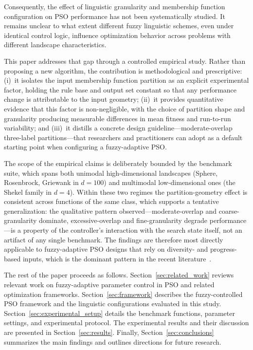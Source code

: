 \documentclass[conference]{IEEEtran}
\newcommand{\new}[1]{{\color{red}#1}}
\begin{document}
Consequently, the effect of linguistic granularity and membership function configuration on PSO performance has not been systematically studied. It remains unclear to what extent different fuzzy linguistic schemes, even under identical control logic, influence optimization behavior across problems with different landscape characteristics.

\new{This paper addresses that gap through a controlled empirical study. Rather than proposing a new algorithm, the contribution is methodological and prescriptive: (i)~it isolates the input membership function partition as an explicit experimental factor, holding the rule base and output set constant so that any performance change is attributable to the input geometry; (ii)~it provides quantitative evidence that this factor is non-negligible, with the choice of partition shape and granularity producing measurable differences in mean fitness and run-to-run variability; and (iii)~it distills a concrete design guideline---moderate-overlap three-label partitions---that researchers and practitioners can adopt as a default starting point when configuring a fuzzy-adaptive PSO.}

\new{The scope of the empirical claims is deliberately bounded by the benchmark suite, which spans both unimodal high-dimensional landscapes (Sphere, Rosenbrock, Griewank in $d{=}100$) and multimodal low-dimensional ones (the Shekel family in $d{=}4$). Within these two regimes the partition-geometry effect is consistent across functions of the same class, which supports a tentative generalization: the qualitative pattern observed---moderate-overlap and coarse-granularity dominate, excessive-overlap and fine-granularity degrade performance---is a property of the controller's interaction with the search state itself, not an artifact of any single benchmark. The findings are therefore most directly applicable to fuzzy-adaptive PSO designs that rely on diversity- and progress-based inputs, which is the dominant pattern in the recent literature~\cite{nobile2018fuzzy, xia2022particle, roy2024hyperparameter, wang2023hierarchical, morales2023stagnation}.}

The rest of the paper proceeds as follows. Section~\ref{sec:related_work} reviews relevant work on fuzzy-adaptive parameter control in PSO and related optimization frameworks. Section~\ref{sec:framework} describes the fuzzy-controlled PSO framework and the linguistic configurations evaluated in this study. Section~\ref{sec:experimental_setup} details the benchmark functions, parameter settings, and experimental protocol. The experimental results and their discussion are presented in Section~\ref{sec:results}. Finally, Section~\ref{sec:conclusions} summarizes the main findings and outlines directions for future research.
\end{document}
